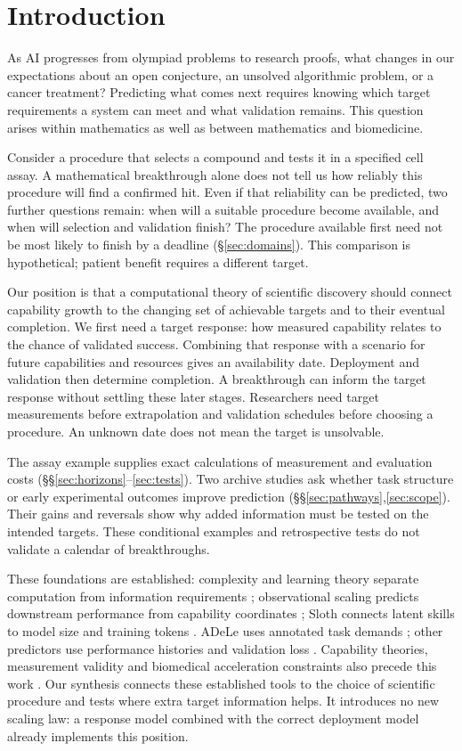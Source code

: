\section{Introduction}
As AI progresses from olympiad problems to research proofs, what changes in our expectations about an open conjecture, an unsolved algorithmic problem, or a cancer treatment? Predicting what comes next requires knowing which target requirements a system can meet and what validation remains. This question arises within mathematics as well as between mathematics and biomedicine.

Consider a procedure that selects a compound and tests it in a specified cell assay. A mathematical breakthrough alone does not tell us how reliably this procedure will find a confirmed hit. Even if that reliability can be predicted, two further questions remain: when will a suitable procedure become available, and when will selection and validation finish? The procedure available first need not be most likely to finish by a deadline (\S\ref{sec:domains}). This comparison is hypothetical; patient benefit requires a different target.

Our position is that a computational theory of scientific discovery should connect capability growth to the changing set of achievable targets and to their eventual completion. We first need a target response: how measured capability relates to the chance of validated success. Combining that response with a scenario for future capabilities and resources gives an availability date. Deployment and validation then determine completion. A breakthrough can inform the target response without settling these later stages. Researchers need target measurements before extrapolation and validation schedules before choosing a procedure. An unknown date does not mean the target is unsolvable.

The assay example supplies exact calculations of measurement and evaluation costs (\S\S\ref{sec:horizons}--\ref{sec:tests}). Two archive studies ask whether task structure or early experimental outcomes improve prediction (\S\S\ref{sec:pathways},\ref{sec:scope}). Their gains and reversals show why added information must be tested on the intended targets. These conditional examples and retrospective tests do not validate a calendar of breakthroughs.

These foundations are established: complexity and learning theory separate computation from information requirements \citep{arorabarak2007,shalev2014,traub1988}; observational scaling predicts downstream performance from capability coordinates \citep{ruan2024}; Sloth connects latent skills to model size and training tokens \citep{polo2025sloth}. ADeLe uses annotated task demands \citep{zhou2026scales}; other predictors use performance histories and validation loss \citep{hu2026neuneu,truong2026irsl}. Capability theories, measurement validity and biomedical acceleration constraints also precede this work \citep{jo2026,wallach2025,hebenstreit2026}. Our synthesis connects these established tools to the choice of scientific procedure and tests where extra target information helps. It introduces no new scaling law: a response model combined with the correct deployment model already implements this position.

